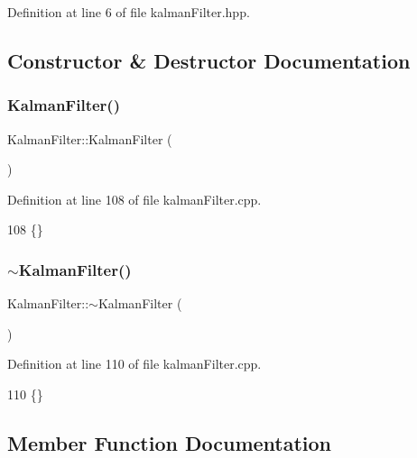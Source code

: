 Definition at line 6 of file kalman\+Filter.\+hpp.



\subsection{Constructor \& Destructor Documentation}
\mbox{\label{class_kalman_filter_aab2cc3677e9fcb19fff16b84c997f30a}} 
\subsubsection{\texorpdfstring{Kalman\+Filter()}{KalmanFilter()}}
{\footnotesize\ttfamily Kalman\+Filter\+::\+Kalman\+Filter (\begin{DoxyParamCaption}{ }\end{DoxyParamCaption})}



Definition at line 108 of file kalman\+Filter.\+cpp.


\begin{DoxyCode}
108 \{\}
\end{DoxyCode}
\mbox{\label{class_kalman_filter_af01e932cd20cec5dd06ca5d8f0b722f4}} 
\subsubsection{\texorpdfstring{$\sim$\+Kalman\+Filter()}{~KalmanFilter()}}
{\footnotesize\ttfamily Kalman\+Filter\+::$\sim$\+Kalman\+Filter (\begin{DoxyParamCaption}{ }\end{DoxyParamCaption})}



Definition at line 110 of file kalman\+Filter.\+cpp.


\begin{DoxyCode}
110 \{\}
\end{DoxyCode}


\subsection{Member Function Documentation}
\mbox{\label{class_kalman_filter_adcf29bef64e646e9cff6d15cb88b5896}} 
